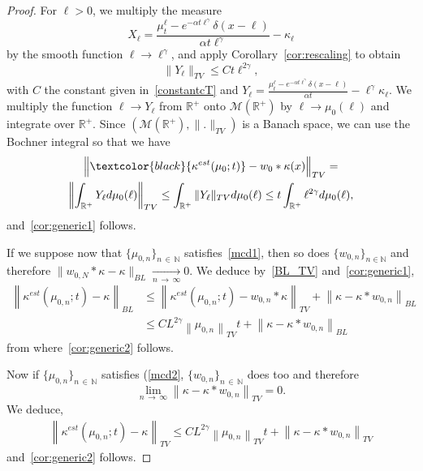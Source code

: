 \documentclass[10pt]{amsart}
\theoremstyle{definition}\newtheorem{defi}[theo]{Definition}\newtheorem{rema}[theo]{Remark}\newtheorem{exam}[theo]{Example}\newtheorem{exem}[theo]{Example}\newtheorem{nota}[theo]{Notation}
\newcommand*\dst{\displaystyle}
\renewcommand*\a{\alpha}
\newcommand*\R{\mathbb{R}}
\newcommand*\M{\mathcal{M}}
\newcommand*\N{\mathbb{N}}
\newcommand{\Mig}[1]{{\textcolor{black}{#1}}}
\begin{document}
\begin{proof}
For $\ell>0$, we multiply the measure
\begin{equation*}
X_{\ell}= \dfrac{\mu_t^{\ell} - e^{-\a t\ell^{\gamma}} \delta(x-\ell) }{\a t \ell^{\gamma}} - \kappa_{\ell}
\end{equation*}
by the smooth function $\ell \to \ell^{\gamma}$, and apply Corollary~\ref{cor:rescaling} to obtain
\begin{equation*}
\|Y_{\ell}\|_{TV}\leq C t \ell^{2\gamma},
\end{equation*}
with $C$ the constant given in~\eqref{constantcT} and $Y_{\ell}= \frac{\mu_t^{\ell} - e^{-\a t\ell^{\gamma}} \delta(x-\ell) }{\a t} - \ell^{\gamma}\kappa_{\ell}$. We multiply the function $\ell \to Y_{\ell}$ from $\R^+$ onto $\M(\R^+)$ by $\ell \to \mu_0(\ell)$ and integrate over $\R^+$. Since $\left(\M(\R^+), \|.\|_{TV}\right)$ is a Banach space, we can use the Bochner integral so that we have
\begin{multline*}
\Big\|\Mig{\kappa^{est}(\mu _0; t)}-w_0\ast\kappa (x)\Big\|_{TV} =\\
\left\| \dst\int_{\R^+} Y_{\ell} d\mu _0(\ell) \right\|_{TV} 
 \leq \dst\int_{\R^+} \|Y_{\ell}\|_{TV} d\mu _0(\ell)
\le t \dst\int_{\R^+}\ell^{2\gamma} d \mu _0(\ell),
\end{multline*}
and~\eqref{cor:generic1} follows.

If we suppose now that $\{\mu _{0, n}\}_{n\,\in\,\N}$ satisfies~\eqref{mcd1}, then so does $\{w _{0, n}\}_{n\in \N}$ and therefore $\|w_{0, N}\ast \kappa -\kappa \|_{BL} \underset{n\,\to\,\infty}{ \longrightarrow}0$. We deduce by~\eqref{BL_TV} and~\eqref{cor:generic1},
\begin{align*}
\left\| \kappa^{est}(\mu _{ 0, n }; t)-\kappa \right\| _{ BL }& \le \left\| \kappa^{est}(\mu _{ 0, n }; t)-w_{0, n}\ast \kappa \right\| _{ TV }+\left\|\kappa -\kappa \ast w _{ 0, n }\right\| _{ BL }\\
&\le CL^{2\gamma }\left\|\mu _{ 0, n }\right\| _{ TV }t +\left\|\kappa -\kappa \ast w _{ 0, n }\right\| _{ BL }
\end{align*}
from where~\eqref{cor:generic2} follows.

Now if $\{\mu _{0, n}\}_{n\,\in\,\N}$ satisfies (\eqref{mcd2}, $\{w _{0, n}\}_{n\,\in\,\N}$ does too and therefore
\begin{equation*}
\lim _{n\,\to\,\infty }\left\|\kappa -\kappa \ast w _{ 0, n }\right\| _{ TV }=0.
\end{equation*}
We deduce,
\begin{align*}
\left\| \kappa^{est}(\mu _{ 0, n }; t)-\kappa \right\| _{ TV } \le C L^{2\gamma }\left\|\mu _{ 0, n }\right\| _{ TV }t +\left\|\kappa -\kappa \ast w _{ 0, n }\right\| _{ TV }
\end{align*}
and~\eqref{cor:generic2} follows.
\end{proof}
\end{document}
